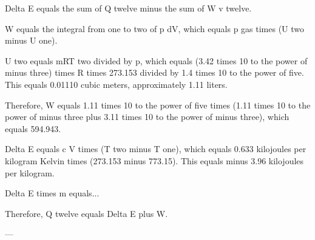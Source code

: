 Delta E equals the sum of Q twelve minus the sum of W v twelve.  

W equals the integral from one to two of p dV, which equals p gas times (U two minus U one).  

U two equals mRT two divided by p, which equals (3.42 times 10 to the power of minus three) times R times 273.153 divided by 1.4 times 10 to the power of five.  
This equals 0.01110 cubic meters, approximately 1.11 liters.  

Therefore, W equals 1.11 times 10 to the power of five times (1.11 times 10 to the power of minus three plus 3.11 times 10 to the power of minus three), which equals 594.943.  

Delta E equals c V times (T two minus T one), which equals 0.633 kilojoules per kilogram Kelvin times (273.153 minus 773.15).  
This equals minus 3.96 kilojoules per kilogram.  

Delta E times m equals...  

Therefore, Q twelve equals Delta E plus W.  

---